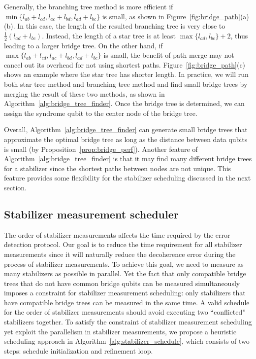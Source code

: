 Generally, the branching tree method is more efficient if $\min \{ l_{ab}+l_{cd}, l_{ac}+l_{bd}, l_{ad}+l_{bc}  \}$ is small, as shown in Figure~\ref{fig:bridge_path}(a)(b). In this case, the length of the resulted branching tree is very close to $\frac{1}{2} ( l_{ad} + l_{bc} )$. Instead, the length of a star tree is at least $\max \{ l_{ad}, l_{bc} \} + 2$, thus leading to a larger bridge tree. On the other hand, if $\max \{ l_{ab}+l_{cd}, l_{ac}+l_{bd}, l_{ad}+l_{bc} \}$ is small, the benefit of path merge may not cancel out its overhead for not using shortest paths. Figure~\ref{fig:bridge_path}(c) shows an example where the star tree has shorter length.
In practice, we will run both star tree method and branching tree method and find small bridge trees by merging the result of these two methods, as shown in Algorithm~\ref{alg:bridge_tree_finder}. Once the bridge tree is determined, we can assign the syndrome qubit to the center node of the bridge tree.

Overall, Algorithm~\ref{alg:bridge_tree_finder} can generate small bridge trees that approximate the optimal bridge tree as long as the distance between data qubits is small %
(by Proposition~\ref{prop:bridge_perf}). 
Another feature of Algorithm~\ref{alg:bridge_tree_finder} is that it may find many different bridge trees for a stabilizer since the shortest paths between nodes are not unique. This feature provides some flexibility for the stabilizer scheduling discussed in the next section.

\subsection{Stabilizer measurement scheduler}



The order of stabilizer measurements affects the time required by the error detection protocol. 
Our goal is to reduce the time requirement for all stabilizer measurements since it will naturally reduce the decoherence error during the process of stabilizer measurements.
To achieve this goal, we need to measure as many stabilizers as possible in parallel. Yet the fact that only compatible bridge trees that do not have common bridge qubits can be measured simultaneously imposes a constraint for  stabilizer measurement scheduling: only stabilizers that have compatible bridge trees can be measured in the same time. A valid schedule for the order of stabilizer measurements should avoid executing two ``conflicted'' stabilizers together.
To satisfy the constraint of stabilizer measurement scheduling yet exploit the parallelism in stabilizer measurements, we propose a heuristic scheduling approach in Algorithm~\ref{alg:stabilizer_schedule}, which consists of two steps: schedule initialization and refinement loop.

